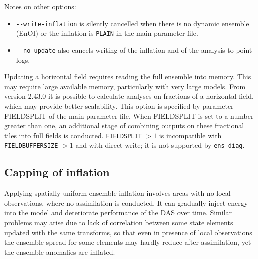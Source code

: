 \documentclass[11pt]{report}
\begin{document}
Notes on other options:
\begin{itemize}
\item \verb|--write-inflation| is silently cancelled when there is no dynamic ensemble (EnOI) or the inflation is \verb|PLAIN| in the main parameter file.
\item \verb|--no-update| also cancels writing of the inflation and of the analysis to point logs.
\end{itemize}

Updating a horizontal field requires reading the full ensemble into memory.
This may require large available memory, particularly with very large models.
From version 2.43.0 it is possible to calculate analyses on fractions of a horizontal field, which may provide better scalability.
This option is specified by parameter FIELDSPLIT of the main parameter file.
When FIELDSPLIT is set to a number greater than one, an additional stage of combining outputs on these fractional tiles into full fields is conducted.
\verb|FIELDSPLIT| $> 1$ is incompatible with \verb|FIELDBUFFERSIZE| $> 1$ and with direct write; it is not supported by \verb|ens_diag|.

\subsection{Capping of inflation}
\label{sec:capping}

Applying spatially uniform ensemble inflation involves areas with no local observations, where no assimilation is conducted.
It can gradually inject energy into the model and deteriorate performance of the DAS over time.
Similar problems may arise due to lack of correlation between some state elements updated with the same transforms, so that even in presence of local observations the ensemble spread for some elements may hardly reduce after assimilation, yet the ensemble anomalies are inflated.
\end{document}
